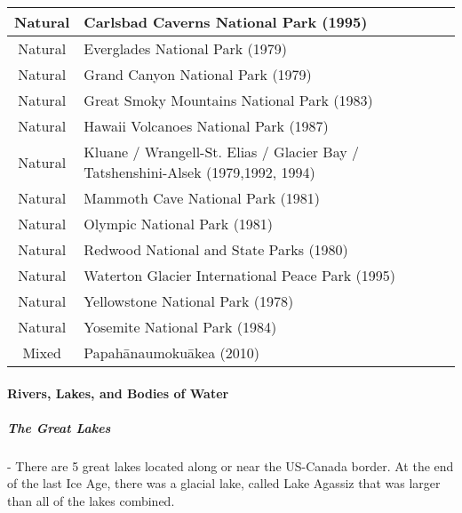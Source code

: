 \begin{longtable}{|c|p{3 in}|p{3in}|}
			\hline
			Natural &Carlsbad Caverns National Park (1995) & \\
			\hline
			Natural &Everglades National Park (1979) & \\
			\hline
			Natural &Grand Canyon National Park (1979) & \\
			\hline
			Natural &Great Smoky Mountains National Park (1983) & \\
			\hline
			Natural &Hawaii Volcanoes National Park (1987) & \\
			\hline
			Natural &Kluane / Wrangell-St. Elias / Glacier Bay / Tatshenshini-Alsek (1979,1992, 1994) & \\
			\hline
			Natural &Mammoth Cave National Park (1981) & \\
			\hline
			Natural &Olympic National Park (1981) & \\
			\hline
			Natural &Redwood National and State Parks  (1980) & \\
			\hline
			Natural &Waterton Glacier International Peace Park (1995) & \\
			\hline
			Natural &Yellowstone National Park (1978) & \\
			\hline
			Natural &Yosemite National Park (1984) & \\
			
			\hline
			Mixed & Papah\=anaumoku\={a}kea (2010) & \\
			\hline
			
		\end{longtable}
			
			
			\newpage
			\paragraph{Rivers, Lakes, and Bodies of Water}
				\subparagraph{The Great Lakes} - There are 5 great lakes located along or near the US-Canada border.  At the end of the last Ice Age, there was a glacial lake, called Lake Agassiz that was larger than all of the lakes combined.  
				
